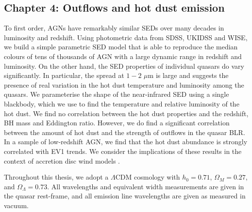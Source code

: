 \subsection{Chapter 4: Outflows and hot dust emission}

To first order, AGNs have remarkably similar SEDs over many decades in luminosity and redshift. 
Using photometric data from SDSS, UKIDSS and WISE, we build a simple parametric SED model that is able to reproduce the median colours of tens of thousands of AGN with a large dynamic range in redshift and luminosity. 
On the other hand, the SED properties of individual quasars do vary significantly.
In particular, the spread at $1-2$ $\mu$m is large and suggests the presence of real variation in the hot dust temperature and luminosity among the quasars.
We parameterise the shape of the near-infrared SED using a single blackbody, which we use to find the temperature and relative luminosity of the hot dust.   
We find no correlation between the hot dust properties and the redshift, BH mass and Eddington ratio. 
However, we do find a significant correlation between the amount of hot dust and the strength of outflows in the quasar BLR. 
In a sample of low-redshift AGN, we find that the hot dust abundance is strongly correlated with EV1 trends. 
We consider the implications of these results in the context of accretion disc wind models \citep[e.g.][]{elitzur06}.

Throughout this thesis, we adopt a $\Lambda$CDM cosmology with $h_0=0.71$, $\Omega_M=0.27$, and $\Omega_\Lambda=0.73$. 
All wavelengths and equivalent width measurements are given in the quasar rest-frame, and all emission line wavelengths are given as measured in vacuum.

